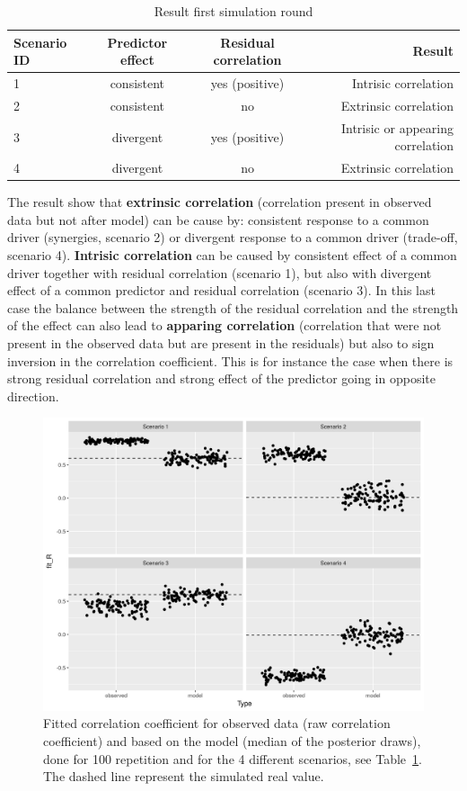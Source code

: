 \documentclass[a4paper,10pt]{article}
\begin{document}
\begin{table}[h!]
\caption{Result first simulation round}
\label{tab:res1}
 \begin{tabular}{lccr}
  Scenario ID & Predictor effect & Residual correlation & Result \\ \hline
  1 & consistent & yes (positive) & Intrisic correlation \\
  2 & consistent & no & Extrinsic correlation \\
  3 & divergent & yes (positive) & Intrisic or appearing correlation \\
  4 & divergent & no & Extrinsic correlation
 \end{tabular}
\end{table}


The result show that \textbf{extrinsic correlation} (correlation present in observed data but not after model) can be cause by: consistent response to a common driver (synergies, scenario 2) or divergent response to a common driver (trade-off, scenario 4). \textbf{Intrisic correlation} can be caused by consistent effect of a common driver together with residual correlation (scenario 1), but also with divergent effect of a common predictor and residual correlation (scenario 3). In this last case the balance between the strength of the residual correlation and the strength of the effect can also lead to \textbf{apparing correlation} (correlation that were not present in the observed data but are present in the residuals) but also to sign inversion in the correlation coefficient. This is for instance the case when there is strong residual correlation and strong effect of the predictor going in opposite direction. 

\begin{figure}
 \caption{Fitted correlation coefficient for observed data (raw correlation coefficient) and based on the model (median of the posterior draws), done for 100 repetition and for the 4 different scenarios, see Table~\ref{tab:res1}. The dashed line represent the simulated real value.}
 \includegraphics[width=\textwidth,keepaspectratio]{simulation1_4_res.png}
\end{figure}
\end{document}
